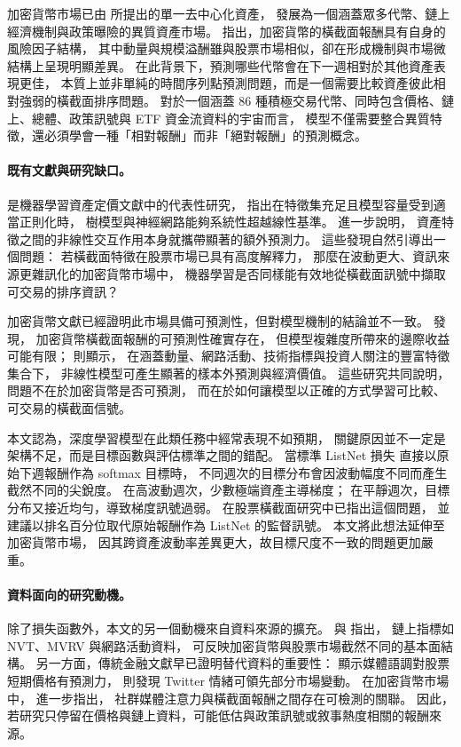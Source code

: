 
加密貨幣市場已由 \citet{nakamoto2008bitcoin} 所提出的單一去中心化資產，
發展為一個涵蓋眾多代幣、鏈上經濟機制與政策曝險的異質資產市場。
\citet{liu2022cryptocurrency} 指出，加密貨幣的橫截面報酬具有自身的風險因子結構，
其中動量與規模溢酬雖與股票市場相似，卻在形成機制與市場微結構上呈現明顯差異。
在此背景下，預測哪些代幣會在下一週相對於其他資產表現更佳，
本質上並非單純的時間序列點預測問題，而是一個需要比較資產彼此相對強弱的橫截面排序問題。
對於一個涵蓋 86 種積極交易代幣、同時包含價格、鏈上、總體、政策訊號與 ETF 資金流資料的宇宙而言，
模型不僅需要整合異質特徵，還必須學會一種「相對報酬」而非「絕對報酬」的預測概念。

\paragraph{既有文獻與研究缺口。}
\citet{gu2020empirical} 是機器學習資產定價文獻中的代表性研究，
指出在特徵集充足且模型容量受到適當正則化時，
樹模型與神經網路能夠系統性超越線性基準。
\citet{freyberger2020dissecting} 進一步說明，
資產特徵之間的非線性交互作用本身就攜帶顯著的額外預測力。
這些發現自然引導出一個問題：
若橫截面特徵在股票市場已具有高度解釋力，
那麼在波動更大、資訊來源更雜訊化的加密貨幣市場中，
機器學習是否同樣能有效地從橫截面訊號中擷取可交易的排序資訊？

加密貨幣文獻已經證明此市場具備可預測性，但對模型機制的結論並不一致。
\citet{cakici2024crypto_ml} 發現，
加密貨幣橫截面報酬的可預測性確實存在，
但模型複雜度所帶來的邊際收益可能有限；
\citet{filippou2024crypto_ml} 則顯示，
在涵蓋動量、網路活動、技術指標與投資人關注的豐富特徵集合下，
非線性模型可產生顯著的樣本外預測與經濟價值。
這些研究共同說明，問題不在於加密貨幣是否可預測，
而在於如何讓模型以正確的方式學習可比較、可交易的橫截面信號。

本文認為，深度學習模型在此類任務中經常表現不如預期，
關鍵原因並不一定是架構不足，而是目標函數與評估標準之間的錯配。
當標準 ListNet 損失 \citep{cao2007learning} 直接以原始下週報酬作為 softmax 目標時，
不同週次的目標分布會因波動幅度不同而產生截然不同的尖銳度。
在高波動週次，少數極端資產主導梯度；
在平靜週次，目標分布又接近均勻，導致梯度訊號過弱。
\citet{poh2021building} 在股票橫截面研究中已指出這個問題，
並建議以排名百分位取代原始報酬作為 ListNet 的監督訊號。
本文將此想法延伸至加密貨幣市場，
因其跨資產波動率差異更大，故目標尺度不一致的問題更加嚴重。

\paragraph{資料面向的研究動機。}
除了損失函數外，本文的另一個動機來自資料來源的擴充。
\citet{cong2021tokenomics} 與 \citet{liu2022cryptocurrency} 指出，
鏈上指標如 NVT、MVRV 與網路活動資料，
可反映加密貨幣與股票市場截然不同的基本面結構。
另一方面，傳統金融文獻早已證明替代資料的重要性：
\citet{tetlock2007giving} 顯示媒體語調對股票短期價格有預測力，
\citet{bollen2011twitter} 則發現 Twitter 情緒可領先部分市場變動。
在加密貨幣市場中，\citet{maitre2025social} 進一步指出，
社群媒體注意力與橫截面報酬之間存在可檢測的關聯。
因此，若研究只停留在價格與鏈上資料，可能低估與政策訊號或敘事熱度相關的報酬來源。

